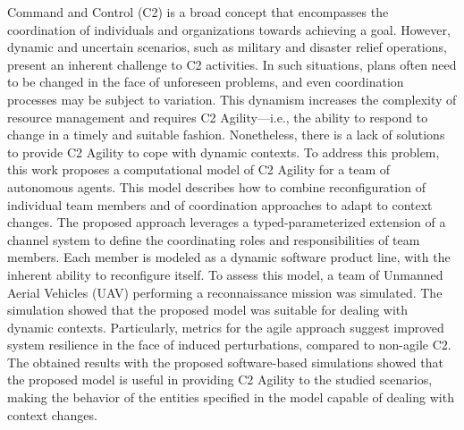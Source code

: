 Command and Control (C2) is a broad concept that encompasses the coordination of individuals and organizations towards achieving a goal.
However, dynamic and uncertain scenarios, such as military and disaster relief operations, present an inherent challenge to C2 activities.
In such situations, plans often need to be changed in the face of unforeseen problems, and even coordination processes may be subject to variation.
This dynamism increases the complexity of \color{black}resource management \color{black} and requires C2 Agility---i.e., the ability to respond to change in a timely and suitable fashion.
Nonetheless, there is a lack of solutions to provide C2 Agility to cope with dynamic contexts.
%
To address this problem, this work proposes a computational model of C2 Agility for a team of autonomous agents.
This model describes how to combine reconfiguration of individual team members and of coordination approaches to adapt to context changes.
%
The proposed approach leverages a typed-parameterized extension of a channel system to define the coordinating roles and responsibilities of team members.
Each member is modeled as a dynamic software product line, with the inherent ability to reconfigure itself.
%
\color{black}
To assess this model, a team of Unmanned Aerial Vehicles (UAV)
\color{black} performing a reconnaissance mission was simulated.
The simulation showed that the proposed model was suitable for dealing with dynamic contexts.
Particularly, metrics for the agile approach suggest improved system resilience in the face of induced perturbations, compared to non-agile C2.
%
The obtained results with the proposed software-based simulations showed that the proposed model is useful in providing C2 Agility to the studied scenarios, making the behavior of the entities specified in the model capable of dealing with context changes.






